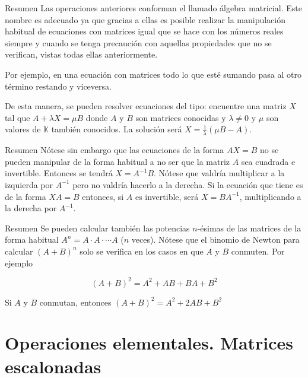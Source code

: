 \documentclass[
  ignorenonframetext,
]{beamer}
\begin{document}
\begin{frame}{Resumen}
\protect\hypertarget{resumen-1}{}
Las operaciones anteriores conforman el llamado álgebra matricial. Este
nombre es adecuado ya que gracias a ellas es posible realizar la
manipulación habitual de ecuaciones con matrices igual que se hace con
los números reales siempre y cuando se tenga precaución con aquellas
propiedades que no se verifican, vistas todas ellas anteriormente.

Por ejemplo, en una ecuación con matrices todo lo que esté sumando pasa
al otro término restando y viceversa.

De esta manera, se pueden resolver ecuaciones del tipo: encuentre una
matriz \(X\) tal que \(A+\lambda X=\mu B\) donde \(A\) y \(B\) son
matrices conocidas y \(\lambda\ne 0\) y \(\mu\) son valores de
\(\mathbb{K}\) también conocidos. La solución será
\(X=\frac{1}{\lambda}(\mu B-A)\).
\end{frame}

\begin{frame}{Resumen}
\protect\hypertarget{resumen-2}{}
Nótese sin embargo que las ecuaciones de la forma \(AX=B\) no se pueden
manipular de la forma habitual a no ser que la matriz \(A\) sea cuadrada
e invertible. Entonces se tendrá \(X=A^{-1}B\). Nótese que valdría
multiplicar a la izquierda por \(A^{-1}\) pero no valdría hacerlo a la
derecha. Si la ecuación que tiene es de la forma \(XA=B\) entonces, si
\(A\) es invertible, será \(X=BA^{-1}\), multiplicando a la derecha por
\(A^{-1}\).
\end{frame}

\begin{frame}{Resumen}
\protect\hypertarget{resumen-3}{}
Se pueden calcular también las potencias \(n\)-ésimas de las matrices de
la forma habitual \(A^n=A\cdot A\cdot\cdots A\) (\(n\) veces). Nótese
que el binomio de Newton para calcular \((A+B)^n\) solo se verifica en
los casos en que \(A\) y \(B\) conmuten. Por ejemplo

\[(A+B)^2=A^2+AB+BA+B^2\]

Si \(A\) y \(B\) conmutan, entonces \((A+B)^2=A^2+2AB+B^2\)
\end{frame}

\hypertarget{operaciones-elementales.-matrices-escalonadas}{%
\section{Operaciones elementales. Matrices
escalonadas}\label{operaciones-elementales.-matrices-escalonadas}}
\end{document}

